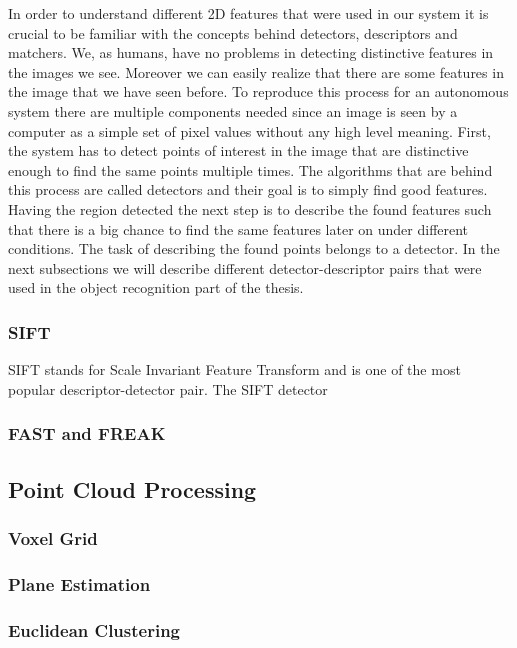 In order to understand different 2D features that were used in our system it is crucial to be familiar with the concepts behind detectors, descriptors and matchers. We, as humans, have no problems in detecting distinctive features in the images we see. Moreover we can easily realize that there are some features in the image that we have seen before. To reproduce this process for an autonomous system there are multiple components needed since an image is seen by a computer as a simple set of pixel values without any high level meaning. First, the system has to detect points of interest in the image that are distinctive enough to find the same points multiple times. The algorithms that are behind this process are called detectors and their goal is to simply find good features. Having the region detected the next step is to describe the found features such that there is a big chance to find the same features later on under different conditions. The task of describing the found points belongs to a detector. In the next subsections we will describe different detector-descriptor pairs that were used in the object recognition part of the thesis.

\subsubsection{SIFT}
SIFT stands for Scale Invariant Feature Transform and is one of the most popular descriptor-detector pair. The SIFT detector    



\subsubsection{FAST and FREAK}


\subsection{Point Cloud Processing}
\subsubsection{Voxel Grid}
\subsubsection{Plane Estimation}
\subsubsection{Euclidean Clustering}

